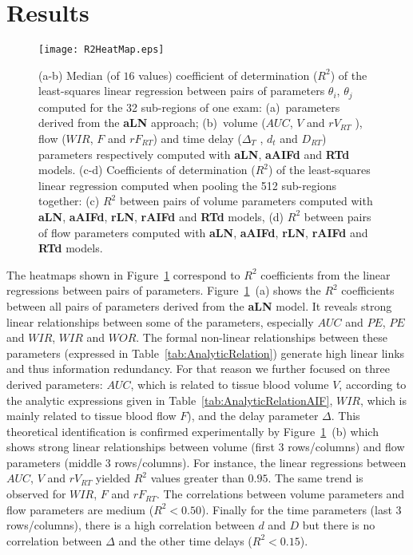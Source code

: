 \section{Results}
\begin{figure}[ht]
  \centering
  \texttt{[image: R2HeatMap.eps]}
  \caption{(a-b) Median (of $16$ values) coefficient of determination ($R^2$) of the least-squares linear regression between pairs of parameters $\theta_i$, $\theta_j$ computed for the 32 sub-regions of one exam: (a)~parameters derived from the \textbf{aLN} approach; (b)~volume ($AUC$, $V$ and $rV_{RT}$ ), flow ($WIR$, $F$ and $rF_{RT}$) and time delay ($\Delta_T$ , $d_t$ and $D_{RT}$) parameters respectively computed with \textbf{aLN}, \textbf{aAIFd}  and \textbf{RTd} models. (c-d) Coefficients of determination ($R^2$) of the least-squares linear regression computed when pooling the 512 sub-regions  together: (c) $R^2$ between pairs of volume parameters computed with \textbf{aLN}, \textbf{aAIFd}, \textbf{rLN}, \textbf{rAIFd}  and \textbf{RTd} models, (d) $R^2$ between pairs of flow parameters computed with \textbf{aLN}, \textbf{aAIFd}, \textbf{rLN}, \textbf{rAIFd}  and \textbf{RTd} models.}
  \label{fig:R2HeatMaps}
\end{figure}

The heatmaps shown in Figure~\ref{fig:R2HeatMaps} correspond to $R^2$ coefficients from the linear regressions between pairs of parameters. Figure~\ref{fig:R2HeatMaps}~(a) shows the $R^2$ coefficients between all pairs of parameters derived from the \textbf{aLN} model. It reveals strong linear relationships between some of the parameters, especially $AUC$ and $PE$,  $PE$ and $WIR$,  $WIR$ and $WOR$. The formal non-linear relationships between these parameters (expressed in Table~\ref{tab:AnalyticRelation}) generate high linear links and thus information redundancy. For that reason we further focused on three derived parameters: $AUC$, which is related to tissue blood volume $V$, according to the analytic expressions given in Table~\ref{tab:AnalyticRelationAIF}, $WIR$, which is mainly related to tissue blood flow $F$), and the delay parameter $\Delta$. This theoretical identification is confirmed experimentally by Figure~\ref{fig:R2HeatMaps}~(b) which shows strong linear relationships between volume (first 3 rows/columns) and flow parameters (middle 3 rows/columns). For instance, the linear regressions between $AUC$, $V$ and $rV_{RT}$ yielded $R^2$ values greater than $0.95$. The same trend is observed for $WIR$, $F$ and $rF_{RT}$. The correlations between volume parameters and flow parameters are medium ($R^2 < 0.50$). Finally for the time parameters (last 3 rows/columns), there is a high correlation between $d$ and $D$ but there is no correlation between $\Delta$ and the other time delays ($R^2 < 0.15$). 

